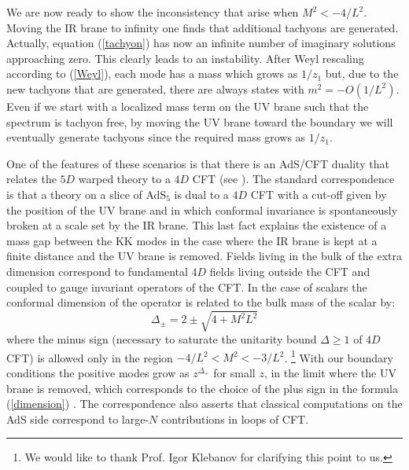 \documentclass[a4paper,12pt,dvips]{article}
\begin{document}
We are  now ready to show the inconsistency that arise when $M^2<
-4/L^2$. Moving the IR brane to infinity one finds that additional
tachyons are generated. Actually, equation (\ref{tachyon}) has now
an infinite number of imaginary solutions approaching zero. This
clearly leads to an instability. After Weyl rescaling according to
(\ref{Weyl}), each mode has a mass which grows as $1/z_1$ but, due
to the new tachyons that are generated, there are always states
with $m^2=- O(1/L^2)$. Even if we start with a localized mass term
on the UV brane such that the spectrum is tachyon free, by moving
the UV brane toward the boundary we will eventually generate
tachyons since the required mass grows as $1/z_1$.

One of the features of these scenarios is that there is an AdS/CFT
duality that relates the $5D$ warped theory to a $4D$ CFT (see
\cite{arkani}). The standard correspondence is that a theory on a
slice of AdS$_5$ is dual to a $4D$ CFT with a cut-off given by the
position of the UV brane and in which conformal invariance is
spontaneously broken at a scale set by the IR brane. This last
fact explains the existence of a mass gap between the KK modes in
the case where the IR brane is kept at a finite distance and the
UV brane is removed. Fields living in the bulk of the extra
dimension correspond to fundamental $4D$ fields living outside the
CFT and coupled to gauge invariant operators of the CFT. In the
case of scalars  the conformal dimension of the operator is
related to the bulk mass of the scalar by:
\begin{equation}
\Delta_\pm=2\pm \sqrt{4+M^2 L^2} \label{dimension}
\end{equation}
where the minus sign (necessary to saturate the unitarity bound
$\Delta \ge 1$ of $4D$ CFT) is allowed only in the region
$-4/L^2<M^2<-3/L^2$. \footnote{We would like to thank Prof. Igor
Klebanov for clarifying this point to us.} With our boundary
conditions the positive modes grow as $z^{\Delta_+}$ for small
$z$, in the limit where the UV brane is removed, which corresponds
to the choice of the plus sign in the formula (\ref{dimension})
\cite{klebanov}.  The correspondence also asserts that classical
computations on the AdS side correspond to large-$N$ contributions
in loops of CFT.
\end{document}
